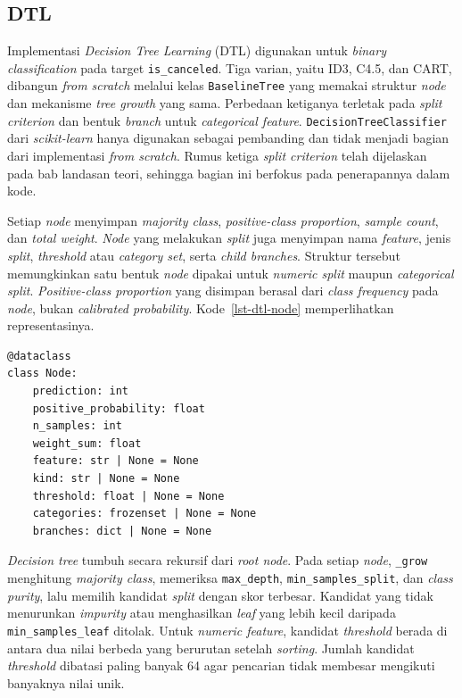 \subsection{DTL}

Implementasi \textit{Decision Tree Learning} (DTL) digunakan untuk \textit{binary classification} pada target \texttt{is\_canceled}. Tiga varian, yaitu ID3, C4.5, dan CART, dibangun \textit{from scratch} melalui kelas \texttt{BaselineTree} yang memakai struktur \textit{node} dan mekanisme \textit{tree growth} yang sama. Perbedaan ketiganya terletak pada \textit{split criterion} dan bentuk \textit{branch} untuk \textit{categorical feature}. \texttt{DecisionTreeClassifier} dari \textit{scikit-learn} hanya digunakan sebagai pembanding dan tidak menjadi bagian dari implementasi \textit{from scratch}. Rumus ketiga \textit{split criterion} telah dijelaskan pada bab landasan teori, sehingga bagian ini berfokus pada penerapannya dalam kode.

Setiap \textit{node} menyimpan \textit{majority class}, \textit{positive-class proportion}, \textit{sample count}, dan \textit{total weight}. \textit{Node} yang melakukan \textit{split} juga menyimpan nama \textit{feature}, jenis \textit{split}, \textit{threshold} atau \textit{category set}, serta \textit{child branches}. Struktur tersebut memungkinkan satu bentuk \textit{node} dipakai untuk \textit{numeric split} maupun \textit{categorical split}. \textit{Positive-class proportion} yang disimpan berasal dari \textit{class frequency} pada \textit{node}, bukan \textit{calibrated probability}. Kode~\ref{lst-dtl-node} memperlihatkan representasinya.

\begin{lstlisting}[caption={Struktur node decision tree from scratch},label={lst-dtl-node}]
@dataclass
class Node:
    prediction: int
    positive_probability: float
    n_samples: int
    weight_sum: float
    feature: str | None = None
    kind: str | None = None
    threshold: float | None = None
    categories: frozenset | None = None
    branches: dict | None = None
\end{lstlisting}

\textit{Decision tree} tumbuh secara rekursif dari \textit{root node}. Pada setiap \textit{node}, \texttt{\_grow} menghitung \textit{majority class}, memeriksa \texttt{max\_depth}, \texttt{min\_samples\_split}, dan \textit{class purity}, lalu memilih kandidat \textit{split} dengan skor terbesar. Kandidat yang tidak menurunkan \textit{impurity} atau menghasilkan \textit{leaf} yang lebih kecil daripada \texttt{min\_samples\_leaf} ditolak. Untuk \textit{numeric feature}, kandidat \textit{threshold} berada di antara dua nilai berbeda yang berurutan setelah \textit{sorting}. Jumlah kandidat \textit{threshold} dibatasi paling banyak 64 agar pencarian tidak membesar mengikuti banyaknya nilai unik.

